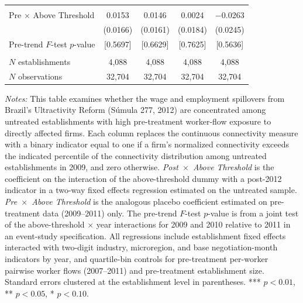 \begin{table}[!htbp]
\begin{tabular}{lcccc}
  & & & & \\
Pre $\times$ Above Threshold & 0.0153 & 0.0146 & 0.0024 & $-$0.0263 \\
  & (0.0166) & (0.0161) & (0.0184) & (0.0245) \\
Pre-trend $F$-test $p$-value & [0.5697] & [0.6629] & [0.7625] & [0.5636] \\
  & & & & \\
$N$ establishments & 4,088 & 4,088 & 4,088 & 4,088 \\
$N$ observations & 32,704 & 32,704 & 32,704 & 32,704 \\
\bottomrule\bottomrule
\end{tabular}
\begin{minipage}{\linewidth}
\footnotesize\vspace{4pt}
\textit{Notes:} This table examines whether the wage and employment spillovers from Brazil's Ultractivity Reform (S\'umula 277, 2012) are concentrated among untreated establishments with high pre-treatment worker-flow exposure to directly affected firms. Each column replaces the continuous connectivity measure with a binary indicator equal to one if a firm's normalized connectivity exceeds the indicated percentile of the connectivity distribution among untreated establishments in 2009, and zero otherwise. \textit{Post~$\times$~Above Threshold} is the coefficient on the interaction of the above-threshold dummy with a post-2012 indicator in a two-way fixed effects regression estimated on the untreated sample. \textit{Pre~$\times$~Above Threshold} is the analogous placebo coefficient estimated on pre-treatment data (2009--2011) only. The pre-trend $F$-test $p$-value is from a joint test of the above-threshold $\times$ year interactions for 2009 and 2010 relative to 2011 in an event-study specification. All regressions include establishment fixed effects interacted with two-digit industry, microregion, and base negotiation-month indicators by year, and quartile-bin controls for pre-treatment per-worker pairwise worker flows (2007--2011) and pre-treatment establishment size. Standard errors clustered at the establishment level in parentheses. *** $p<0.01$, ** $p<0.05$, * $p<0.10$.
\end{minipage}
\end{table}
